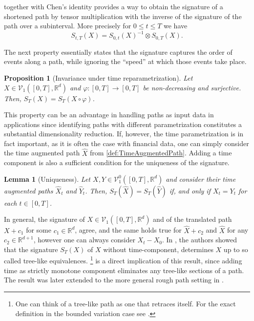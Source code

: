 \documentclass[
    a4paper,
    11pt,
    bibliography=totoc,
    listof=totoc,      
    headinclude=true,
    cleardoublepage=empty,
]{scrbook}
\theoremstyle{plain}
\newtheorem{lemma}[theorem]{Lemma}
\newtheorem{proposition}[theorem]{Proposition}
\theoremstyle{definition}
\theoremstyle{remark}
\newcommand{\SetR}{\mathbb R}
\begin{document}
 together with Chen's identity provides a way to 
obtain the signature of a shortened path by tensor multiplication with the
inverse of the signature of the path over a subinterval. More precisely for 
$0 \leq t \leq T$ we have
\[
    S_{t,T}(X) = S_{0,t}(X)^{-1} \otimes S_{0,T}(X).
\]

The next property essentially states that the signature captures the order of
events along a path, while ignoring the ``speed'' at which those events take 
place.

\begin{proposition}[Invariance under time reparametrization]
\label{prop:ReparametrizationInvariance}
    Let $X\in\mathcal{V}_1([0,T],\SetR^d)$ and $\varphi:[0,T]\to[0,T]$ be 
    non-decreasing and surjective. Then, $S_T(X) = S_T(X\circ \varphi)$.
\end{proposition}
This property can be an advantage in handling paths as input data in 
applications since identifying paths with different parametrization 
constitutes a substantial dimensionality reduction. If, however, the time 
parametrization is in fact important, as it is often the case with financial 
data, one can simply consider the time augmented path $\widehat{X}$ from 
\cref{def:TimeAugmentedPath}. Adding a time component is also a sufficient 
condition for the uniqueness of the signature.

\begin{lemma}[Uniqueness]
\label{lem:Uniqueness}
    Let $X, Y \in \mathcal{V}^0_1([0,T],\SetR^d)$ and consider their time 
    augmented paths $\widehat{X}_t$ and $\widehat{Y}_t$. Then, 
    $S_T(\widehat{X}) = S_T(\widehat{Y})$ if, and only if $X_t=Y_t$ for each 
    $t\in[0,T]$.
\end{lemma}

In general, the signature of $X\in\mathcal{V}_1([0,T],\SetR^d)$ and of the 
translated path $X+c_1$ for some $c_1\in\SetR^d$, agree, and the same holds 
true for $\widehat{X}+c_2$ and $\widehat X$ for any $c_2\in\SetR^{d+1}$, 
however one can always consider $X_t-X_0$. In \cite{hambly2010_uspbvrpg}, the 
authors showed that the signature $S_T(X)$ of $X$ without time-component, 
determines $X$ up to so called tree-like equivalences.%
\footnote{
    One can think of a tree-like path as one that retraces itself. For the 
    exact definition in the bounded variation case see \cite[Definition
    1.2]{hambly2010_uspbvrpg}.
} 
 is a direct implication of this result, since adding 
time as strictly monotone component eliminates any tree-like sections of a 
path. The result was later extended to the more general rough path setting in
\cite{boedihardjo2016_srpu}.
\end{document}
